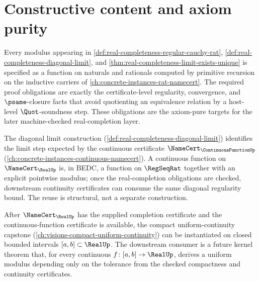 \section{Constructive content and axiom purity}
\label{sec:real-completeness-axiom-purity}

\begin{remark}
\label{rem:real-completeness-explicit-moduli}
Every modulus appearing in \autoref{def:real-completeness-regular-cauchy-rat}, \autoref{def:real-completeness-diagonal-limit}, and \autoref{thm:real-completeness-limit-exists-unique} is specified as a function on naturals and rationals computed by primitive recursion on the inductive carriers of \autoref{ch:concrete-instances-rat-namecert}. The required proof obligations are exactly the certificate-level regularity, convergence, and $\psame$-closure facts that avoid quotienting an equivalence relation by a host-level $\Quot$-soundness step. These obligations are the axiom-pure targets for the later machine-checked real-completion layer.
\end{remark}

\begin{remark}
\label{rem:real-completeness-reuse-continuous}
The diagonal limit construction (\autoref{def:real-completeness-diagonal-limit}) identifies the limit step expected by the continuous certificate $\NameCert_{\ContinuousFunctionUp}$ (\autoref{ch:concrete-instances-continuous-namecert}). A continuous function on $\NameCert_{\RealUp}$ is, in BEDC, a function on $\RegSeqRat$ together with an explicit pointwise modulus; once the real-completion obligations are checked, downstream continuity certificates can consume the same diagonal regularity bound. The reuse is structural, not a separate construction.
\end{remark}

\begin{remark}
\label{rem:real-completeness-compact-composition}
After $\NameCert_{\RealUp}$ has the supplied completion certificate and the continuous-function certificate is available, the compact uniform-continuity capstone (\autoref{ch:visions-compact-uniform-continuity}) can be instantiated on closed bounded intervals $[a, b] \subset \RealUp$. The downstream consumer is a future kernel theorem that, for every continuous $f \colon [a, b] \to \RealUp$, derives a uniform modulus depending only on the tolerance from the checked compactness and continuity certificates.
\end{remark}

